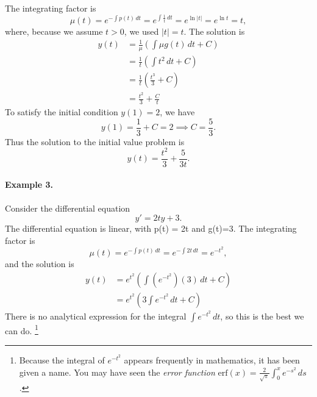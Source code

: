 \documentclass[reqno]{immbook}
\begin{document}
The integrating factor is
\begin{equation}
   \mu(t) = e^{-\int p(t)\,dt} = e^{\int \frac{1}{t}\, dt}
      = e^{\ln |t|} = e^{\ln t} = t,
\end{equation}
where, because we assume $t>0$,  we used $|t|=t$.
The solution is
\begin{equation}
\begin{split}
   y(t) & = \frac{1}{\mu} \left( \int \mu g(t)\,dt + C\right) \\
        & = \frac{1}{t} \left( \int t^2 \,dt+C\right) \\
	& = \frac{1}{t} \left( \frac{t^3}{3} + C \right)\\
	& = \frac{t^2}{3} + \frac{C}{t}
\end{split}
\end{equation}
To satisfy the initial condition $y(1)=2$, we have
\begin{equation}
   y(1) = \frac{1}{3} + C = 2 \implies C = \frac{5}{3}.
\end{equation}
Thus the solution to the initial value problem is
\begin{equation}
   y(t) = \frac{t^2}{3} + \frac{5}{3t}.
\end{equation}


\paragraph{Example 3.}
Consider the differential equation
\begin{equation}
    y' = 2ty + 3.
\end{equation}
The differential equation is linear, with p(t) = 2t and g(t)=3.
The integrating factor is
\begin{equation}
   \mu(t) = e^{-\int p(t)\,dt} = e^{-\int 2t\, dt}
      = e^{-t^2},
\end{equation}
and the solution is
\begin{equation}
\begin{split}
   y(t) & = e^{t^2} \left( \int \left(e^{-t^2}\right)\left(3\right)\,dt + C\right) \\
        & = e^{t^2} \left( 3\int e^{-t^2}\,dt+C\right)
\end{split}
\end{equation}
There is no analytical expression for the integral $\int e^{-t^2}\, dt$,
so this is the best we can do.%
\footnote{%
Because the integral of $e^{-t^2}$ appears frequently in mathematics,
it has been given a name.
You may have seen the \emph{error function}
$\textrm{erf}(x) = \frac{2}{\sqrt{\pi}}\int_0^x e^{-s^2}\,ds$.}
\end{document}
